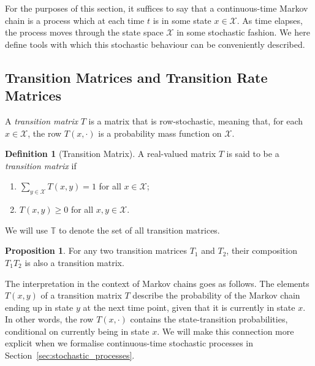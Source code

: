 \documentclass[10pt,a4paper]{paper}
\theoremstyle{definition}
\newtheorem{proposition}[theorem]{Proposition}
\newtheorem{definition}{Definition}
\newcommand{\states}{\mathcal{X}}
\begin{document}
For the purposes of this section, it suffices to say that a continuous-time Markov chain is a process which at each time $t$ is in some state $x\in\states$. As time elapses, the process moves through the state space $\states$ in some stochastic fashion. We here define tools with which this stochastic behaviour can be conveniently described.

\subsection{Transition Matrices and Transition Rate Matrices}\label{sec:trans_rate_matrices}

A \emph{transition matrix} $T$ is a matrix that is row-stochastic, meaning that, for each $x\in\states$, the row $T(x,\cdot)$ is a probability mass function on $\states$.
\begin{definition}[Transition Matrix]\label{def:stoch_matrix}
A real-valued matrix $T$ is said to be a \emph{transition matrix} if
\vspace{5pt}
\begin{enumerate}[label=T\arabic*:,ref=T\arabic*]
\item\label{def:T:sumone}
$\sum_{y\in\states}T(x,y)=1$ for all $x\in\states$;\label{def:trans_matrix_is_stochastic}
\item\label{def:T:nonneg}
$T(x,y)\geq0$ for all $x,y\in\states$.
\end{enumerate}
\vspace{5pt}
\noindent We will use $\mathbb{T}$ to denote the set of all transition matrices.
\end{definition}

\begin{proposition}\label{lemma:compositiontransitionmatrix}
For any two transition matrices $T_1$ and $T_2$, their composition $T_1T_2$ is also a transition matrix.
\end{proposition}

The interpretation in the context of Markov chains goes as follows. The elements $T(x,y)$ of a transition matrix $T$ describe the probability of the Markov chain ending up in state $y$ at the next time point, given that it is currently in state $x$. In other words, the row $T(x,\cdot)$ contains the state-transition probabilities, conditional on currently being in state $x$. We will make this connection more explicit when we formalise continuous-time stochastic processes in Section~\ref{sec:stochastic_processes}.
\end{document}
